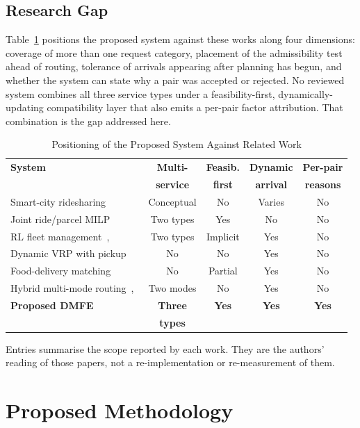 \documentclass[conference]{IEEEtran}
\begin{document}
\subsection{Research Gap}
Table~\ref{tab:gap} positions the proposed system against these works along four dimensions: coverage of more than one request category, placement of the admissibility test ahead of routing, tolerance of arrivals appearing after planning has begun, and whether the system can state why a pair was accepted or rejected. No reviewed system combines all three service types under a feasibility-first, dynamically-updating compatibility layer that also emits a per-pair factor attribution. That combination is the gap addressed here.

\begin{table}[ht]
\centering
\caption{Positioning of the Proposed System Against Related Work}
\label{tab:gap}
\begin{tabular}{p{3.2cm}cccc}
\toprule
\textbf{System} & \textbf{Multi-} & \textbf{Feasib.} & \textbf{Dynamic} & \textbf{Per-pair} \\
& \textbf{service} & \textbf{first} & \textbf{arrival} & \textbf{reasons} \\
\midrule
Smart-city ridesharing~\cite{ref2} & Conceptual & No & Varies & No \\
Joint ride/parcel MILP~\cite{ref3} & Two types & Yes & No & No \\
RL fleet management~\cite{ref4},~\cite{ref5} & Two types & Implicit & Yes & No \\
Dynamic VRP with pickup~\cite{ref7} & No & No & Yes & No \\
Food-delivery matching~\cite{ref8} & No & Partial & Yes & No \\
Hybrid multi-mode routing~\cite{ref9},~\cite{ref10} & Two modes & No & Yes & No \\
\textbf{Proposed DMFE} & \textbf{Three} & \textbf{Yes} & \textbf{Yes} & \textbf{Yes} \\
& \textbf{types} & & & \\
\bottomrule
\end{tabular}
\vspace{1ex}
\raggedright\scriptsize Entries summarise the scope reported by each work. They are the authors' reading of those papers, not a re-implementation or re-measurement of them.
\end{table}

\section{Proposed Methodology}
\end{document}
